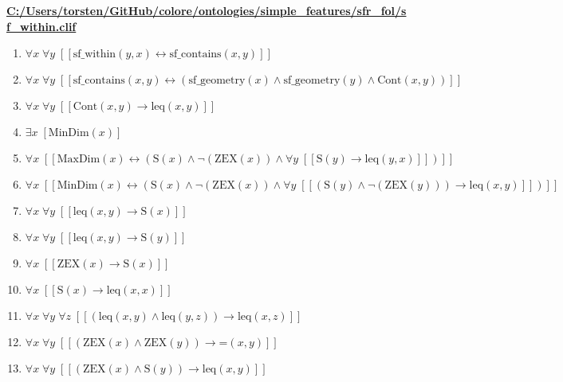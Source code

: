 \documentclass{article}
\begin{document}
\textbf{\url{C:/Users/torsten/GitHub/colore/ontologies/simple\_features/sfr\_fol/sf\_within.clif}}

\begin{enumerate}
\item $\forall x\; \forall y\;  \left[ \left[ \textrm{sf\_within}(y,x) \leftrightarrow \textrm{sf\_contains}(x,y) \right] \right]$
\item $\forall x\; \forall y\;  \left[ \left[ \textrm{sf\_contains}(x,y) \leftrightarrow \left(\textrm{sf\_geometry}(x) \land \textrm{sf\_geometry}(y) \land \textrm{Cont}(x,y)\right) \right] \right]$
\item $\forall x\; \forall y\;  \left[ \left[ \textrm{Cont}(x,y) \rightarrow \textrm{leq}(x,y) \right] \right]$
\item $\exists x\;  \left[ \textrm{MinDim}(x) \right]$
\item $\forall x\;  \left[ \left[ \textrm{MaxDim}(x) \leftrightarrow \left(\textrm{S}(x) \land \neg \left(\textrm{ZEX}(x)\right) \land \forall y\;  \left[ \left[ \textrm{S}(y) \rightarrow \textrm{leq}(y,x) \right] \right]\right) \right] \right]$
\item $\forall x\;  \left[ \left[ \textrm{MinDim}(x) \leftrightarrow \left(\textrm{S}(x) \land \neg \left(\textrm{ZEX}(x)\right) \land \forall y\;  \left[ \left[ \left(\textrm{S}(y) \land \neg \left(\textrm{ZEX}(y)\right)\right) \rightarrow \textrm{leq}(x,y) \right] \right]\right) \right] \right]$
\item $\forall x\; \forall y\;  \left[ \left[ \textrm{leq}(x,y) \rightarrow \textrm{S}(x) \right] \right]$
\item $\forall x\; \forall y\;  \left[ \left[ \textrm{leq}(x,y) \rightarrow \textrm{S}(y) \right] \right]$
\item $\forall x\;  \left[ \left[ \textrm{ZEX}(x) \rightarrow \textrm{S}(x) \right] \right]$
\item $\forall x\;  \left[ \left[ \textrm{S}(x) \rightarrow \textrm{leq}(x,x) \right] \right]$
\item $\forall x\; \forall y\; \forall z\;  \left[ \left[ \left(\textrm{leq}(x,y) \land \textrm{leq}(y,z)\right) \rightarrow \textrm{leq}(x,z) \right] \right]$
\item $\forall x\; \forall y\;  \left[ \left[ \left(\textrm{ZEX}(x) \land \textrm{ZEX}(y)\right) \rightarrow \textrm{=}(x,y) \right] \right]$
\item $\forall x\; \forall y\;  \left[ \left[ \left(\textrm{ZEX}(x) \land \textrm{S}(y)\right) \rightarrow \textrm{leq}(x,y) \right] \right]$

\end{enumerate}
\end{document}
